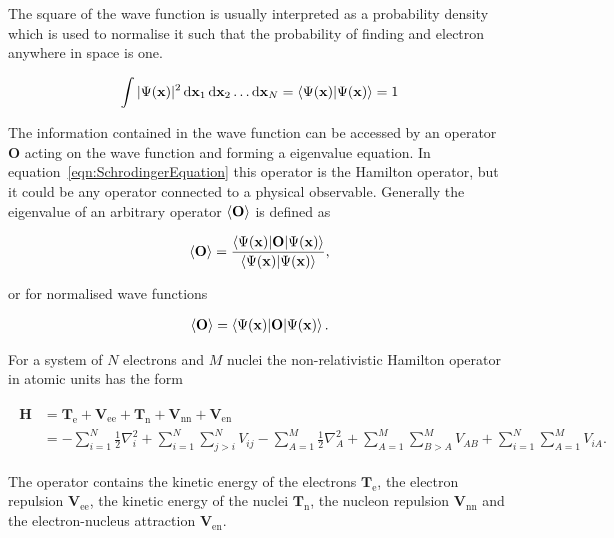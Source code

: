 The square of the wave function is usually interpreted as a probability density
which is used to normalise it such that the probability of finding and electron
anywhere in space is one.

\begin{align}
	\int |\Psi(\mathbf{x})|^2\dif \mathbf{x}_1\dif \mathbf{x}_2\ldots\dif \mathbf{x}_N=\braket{\Psi(\mathbf{x})|\Psi(\mathbf{x})}=1
\end{align}

The information contained in the wave function can be accessed by an operator
$\mathbf{O}$ acting on the wave function and forming a eigenvalue equation. In
equation~\eqref{eqn:SchrodingerEquation} this operator is the Hamilton
operator, but it could be any operator connected to a physical observable.
Generally the eigenvalue of an arbitrary operator $\braket{\mathbf{O}}$ is
defined as

\begin{equation}
	\braket{\mathbf{O}}=\frac{\braket{\Psi(\mathbf{x})|\mathbf{O}|\Psi(\mathbf{x})}}{\braket{\Psi(\mathbf{x})|\Psi(\mathbf{x})}},
\end{equation}

or for normalised wave functions

\begin{align}
	\braket{\mathbf{O}}=\braket{\Psi(\mathbf{x})|\mathbf{O}|\Psi(\mathbf{x})}.
\end{align}

For a system of $N$ electrons and $M$ nuclei the non-relativistic Hamilton
operator in atomic units has the form

\begin{align}
\begin{aligned}
    \mathbf{H}&=\mathbf{T}_\text{e} + \mathbf{V}_\text{ee} + \mathbf{T}_\text{n} + \mathbf{V}_\text{nn} + \mathbf{V}_\text{en} \\
    &=-\sum_{i=1}^N\frac{1}{2}\nabla_i^2
    + \sum_{i=1}^N\sum_{j>i}^NV_{ij}
    - \sum_{A=1}^M\frac{1}{2}\nabla_A^2
    + \sum_{A=1}^M\sum_{B>A}^MV_{AB}
    + \sum_{i=1}^N\sum_{A=1}^MV_{iA}.\label{eqn:hamiltonoperator}
\end{aligned}
\end{align}

The operator contains the kinetic energy of the electrons
$\mathbf{T}_\text{e}$, the electron repulsion $\mathbf{V}_\text{ee}$, the
kinetic energy of the nuclei $\mathbf{T}_\text{n}$, the nucleon repulsion
$\mathbf{V}_\text{nn}$ and the electron-nucleus attraction
$\mathbf{V}_\text{en}$.

